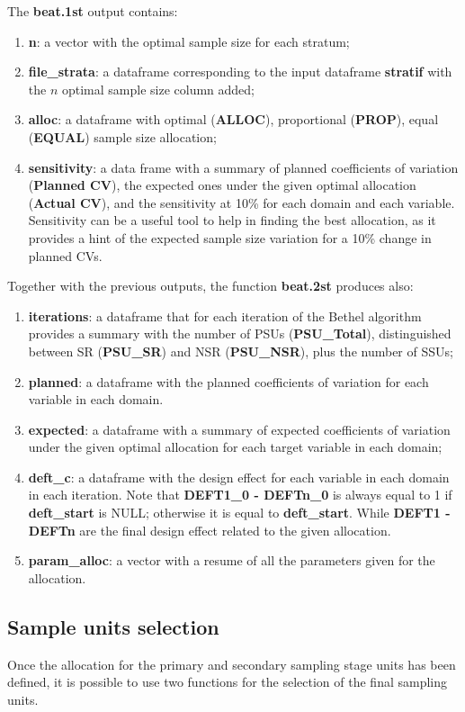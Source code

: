 The \textbf{beat.1st} output contains:
\begin{enumerate}
	\item \textbf{n}: a vector with the optimal sample size for each stratum;
	\item \textbf{file\_strata}: a dataframe corresponding to the input dataframe \textbf{stratif} with the $n$ optimal sample size column added;
	\item \textbf{alloc}: a dataframe with optimal (\textbf{ALLOC}), proportional (\textbf{PROP}), equal (\textbf{EQUAL}) sample size allocation;
	\item \textbf{sensitivity}: a data frame with a summary of planned coefficients of variation (\textbf{Planned CV}), the expected ones under the given optimal allocation (\textbf{Actual CV}), and the sensitivity at 10\% for each domain and each variable. Sensitivity can be a useful tool to help in finding the best allocation, as it provides a hint of the expected sample size variation for a 10\% change in planned CVs.
\end{enumerate}

Together with the previous outputs, the function \textbf{beat.2st} produces also:
\begin{enumerate}
	\item \textbf{iterations}: a dataframe that for each iteration of the Bethel algorithm provides a summary with the number of PSUs (\textbf{PSU\_Total}), distinguished between SR (\textbf{PSU\_SR}) and NSR (\textbf{PSU\_NSR}), plus the number of SSUs;
	\item \textbf{planned}: a dataframe with the planned coefficients of variation for each variable in each domain.
	\item \textbf{expected}: a dataframe with a summary of expected coefficients of variation under the given optimal allocation for each target variable in each domain;
	\item \textbf{deft\_c}: a dataframe with the design effect for each variable in each domain in each iteration. Note that \textbf{DEFT1\_0 - DEFTn\_0} is always equal to 1 if \textbf{deft\_start} is NULL; otherwise it is equal to \textbf{deft\_start}. While \textbf{DEFT1 - DEFTn} are the final design effect related to the given allocation.
	\item \textbf{param\_alloc}: a vector with a resume of all the parameters given for the allocation.
\end{enumerate}

\subsection{Sample units selection} \label{sec:selection}
Once the allocation for the primary and secondary sampling stage units has been defined, it is possible to use two functions for the selection of the final sampling units.

